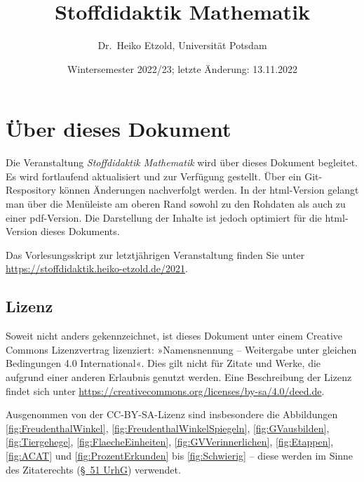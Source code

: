\documentclass[
]{scrbook}
\title{Stoffdidaktik Mathematik}
\author{Dr.~Heiko Etzold, Universität Potsdam}
\date{Wintersemester 2022/23; letzte Änderung: 13.11.2022}
\makeatletter
\def\renewtheorem#1{%
  \expandafter\let\csname#1\endcsname\relax
  \expandafter\let\csname c@#1\endcsname\relax
  \gdef\renewtheorem@envname{#1}
  \renewtheorem@secpar
}
\def\renewtheorem@secpar{\@ifnextchar[{\renewtheorem@numberedlike}{\renewtheorem@nonumberedlike}}
\def\renewtheorem@numberedlike[#1]#2{\newtheorem{\renewtheorem@envname}[#1]{#2}}
\def\renewtheorem@nonumberedlike#1{
\def\renewtheorem@caption{#1}
\edef\renewtheorem@nowithin{\noexpand\newtheorem{\renewtheorem@envname}{\renewtheorem@caption}}
\renewtheorem@thirdpar
}
\def\renewtheorem@thirdpar{\@ifnextchar[{\renewtheorem@within}{\renewtheorem@nowithin}}
\def\renewtheorem@within[#1]{\renewtheorem@nowithin[#1]}
\theoremstyle{definition}
\theoremstyle{definition}
\theoremstyle{definition}
\theoremstyle{definition}
\theoremstyle{remark}
\makeatother
\begin{document}
\maketitle

% 

{
\hypersetup{linkcolor=}
\setcounter{tocdepth}{1}
\tableofcontents
}
\hypertarget{uxfcber-dieses-dokument}{%
\chapter*{Über dieses Dokument}\label{uxfcber-dieses-dokument}}

Die Veranstaltung \emph{Stoffdidaktik Mathematik} wird über dieses Dokument begleitet. Es wird fortlaufend aktualisiert und zur Verfügung gestellt. Über ein Git-Respository können Änderungen nachverfolgt werden. In der html-Version gelangt man über die Menüleiste am oberen Rand sowohl zu den Rohdaten als auch zu einer pdf-Version. Die Darstellung der Inhalte ist jedoch optimiert für die html-Version dieses Dokuments.

Das Vorlesungsskript zur letztjährigen Veranstaltung finden Sie unter \url{https://stoffdidaktik.heiko-etzold.de/2021}.

\hypertarget{lizenz}{%
\section*{Lizenz}\label{lizenz}}

Soweit nicht anders gekennzeichnet, ist dieses Dokument unter einem Creative Commons Lizenzvertrag lizenziert: »Namensnennung -- Weitergabe unter gleichen Bedingungen 4.0 International«. Dies gilt nicht für Zitate und Werke, die aufgrund einer anderen Erlaubnis genutzt werden.
Eine Beschreibung der Lizenz findet sich unter \url{https://creativecommons.org/licenses/by-sa/4.0/deed.de}.

Ausgenommen von der CC-BY-SA-Lizenz sind insbesondere die Abbildungen \ref{fig:FreudenthalWinkel}, \ref{fig:FreudenthalWinkelSpiegeln}, \ref{fig:GVausbilden}, \ref{fig:Tiergehege}, \ref{fig:FlaecheEinheiten}, \ref{fig:GVVerinnerlichen}, \ref{fig:Etappen}, \ref{fig:ACAT} und \ref{fig:ProzentErkunden} bis \ref{fig:Schwierig} -- diese werden im Sinne des Zitaterechts (\href{https://www.gesetze-im-internet.de/urhg/__51.html}{§~51 UrhG}) verwendet.
\end{document}
